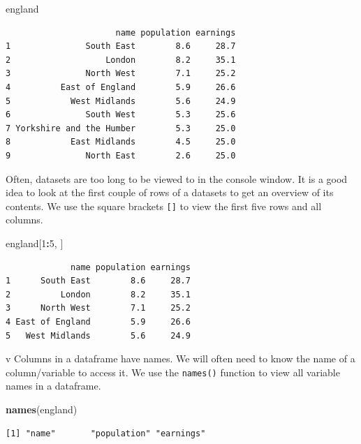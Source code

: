 \documentclass[]{article}
\newenvironment{Shaded}{\begin{snugshade}}{\end{snugshade}}
\newcommand{\DecValTok}[1]{\textcolor[rgb]{0.00,0.00,0.81}{#1}}
\newcommand{\KeywordTok}[1]{\textcolor[rgb]{0.13,0.29,0.53}{\textbf{#1}}}
\newcommand{\NormalTok}[1]{#1}
\newcommand{\OperatorTok}[1]{\textcolor[rgb]{0.81,0.36,0.00}{\textbf{#1}}}
\begin{document}
\begin{Shaded}
\begin{Highlighting}[]
\NormalTok{england}
\end{Highlighting}
\end{Shaded}

\begin{verbatim}
                      name population earnings
1               South East        8.6     28.7
2                   London        8.2     35.1
3               North West        7.1     25.2
4          East of England        5.9     26.6
5            West Midlands        5.6     24.9
6               South West        5.3     25.6
7 Yorkshire and the Humber        5.3     25.0
8            East Midlands        4.5     25.0
9               North East        2.6     25.0
\end{verbatim}

Often, datasets are too long to be viewed to in the console window. It is a good idea to look at the first couple of rows of a datasets to get an overview of its contents. We use the square brackets \texttt{{[}{]}} to view the first five rows and all columns.

\begin{Shaded}
\begin{Highlighting}[]
\NormalTok{england[}\DecValTok{1}\OperatorTok{:}\DecValTok{5}\NormalTok{, ]}
\end{Highlighting}
\end{Shaded}

\begin{verbatim}
             name population earnings
1      South East        8.6     28.7
2          London        8.2     35.1
3      North West        7.1     25.2
4 East of England        5.9     26.6
5   West Midlands        5.6     24.9
\end{verbatim}

v
Columns in a dataframe have names. We will often need to know the name of a column/variable to access it. We use the \texttt{names()} function to view all variable names in a dataframe.

\begin{Shaded}
\begin{Highlighting}[]
\KeywordTok{names}\NormalTok{(england)}
\end{Highlighting}
\end{Shaded}

\begin{verbatim}
[1] "name"       "population" "earnings"  
\end{verbatim}
\end{document}
